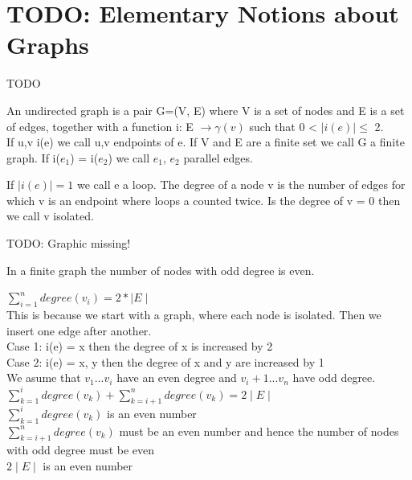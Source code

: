 \chapter{TODO: Elementary Notions about Graphs}

\begin{descr}
    TODO
\end{descr}


\begin{definition}
	An undirected graph is a pair G=(V, E) where V is a set of nodes and E is a set of edges, together with a function i: E $\rightarrow \gamma(v)$ such that 0 < $\mid i(e) \mid  \le $ 2.
\\
If u,v i(e) we call u,v endpoints of e. If V and E are a finite set we call G a finite graph. If i($e{_1}$) =  i($e{_2}$) we call  $e{_1}$, $e{_2}$ parallel edges.

If $\mid i(e) \mid = 1$ we call e a loop. The degree of a node v is the number of edges for which v is an endpoint where loops a counted twice.
Is the degree of v = 0 then we call v isolated.
\end{definition}

\begin{example*}
    TODO: Graphic missing!
\end{example*}

\begin{lemma}
    In a finite graph the number of nodes with odd degree is even.
\end{lemma}


\begin{prooof}
    $\sum\limits_{i=1}^n degree(v{_i}) = 2* \mid E \mid$ \\
This is because we start with a graph, where each node is isolated. Then we insert one edge after another.\\
Case 1: i(e) = {x} then the degree of x is increased by 2\\
Case 2: i(e) = {x, y} then the degree of x and y are increased by 1\\
We asume that $v{_1}...v{_i}$ have an even degree and $v{_i+1}...v{_n}$ have odd degree.\\

$\sum\limits_{k=1}^i degree(v{_k}) + \sum\limits_{k=i+1}^n degree(v{_k}) = 2 \mid E \mid$\\

$\sum\limits_{k=1}^i degree(v{_k})$ is an even number\\

$\sum\limits_{k=i+1}^n degree(v{_k})$ must be an even number and hence the number of nodes with odd degree must be even\\

$ 2 \mid E \mid$ is an even number \\

\end{prooof}


